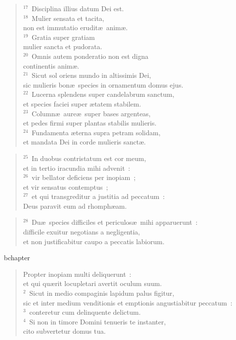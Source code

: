 \begin{verse}
${}^{17}$~Disciplina illius datum Dei est.\\
${}^{18}$~Mulier sensata et tacita,\\ non est immutatio erudit\ae\ anim\ae .\\
${}^{19}$~Gratia super gratiam\\ mulier sancta et pudorata.\\
${}^{20}$~Omnis autem ponderatio non est digna\\ continentis anim\ae .\\
${}^{21}$~Sicut sol oriens mundo in altissimis Dei,\\ sic mulieris bon\ae\ species in ornamentum domus ejus.\\
${}^{22}$~Lucerna splendens super candelabrum sanctum,\\ et species faciei super \ae tatem stabilem.\\
${}^{23}$~Column\ae\ aure\ae\ super bases argenteas,\\ et pedes firmi super plantas stabilis mulieris.\\
${}^{24}$~Fundamenta \ae terna supra petram solidam,\\ et mandata Dei in corde mulieris sanct\ae .\end{verse}


\begin{verse}${}^{25}$~In duobus contristatum est cor meum,\\ et in tertio iracundia mihi advenit~:\\
${}^{26}$~vir bellator deficiens per inopiam~;\\ et vir sensatus contemptus~;\\
${}^{27}$~et qui transgreditur a justitia ad peccatum~:\\ Deus paravit eum ad rhomph\ae am.\end{verse}


\begin{verse}${}^{28}$~Du\ae\ species difficiles et periculos\ae\ mihi apparuerunt~:\\ difficile exuitur negotians a negligentia,\\ et non justificabitur caupo a peccatis labiorum.\end{verse}


bchapter\begin{verse}\vspace{-19pt}Propter inopiam multi deliquerunt~:\\ et qui qu\ae rit locupletari avertit oculum suum.\\
${}^{2}$~Sicut in medio compaginis lapidum palus figitur,\\ sic et inter medium venditionis et emptionis angustiabitur peccatum~:\\
${}^{3}$~conteretur cum delinquente delictum.\\
${}^{4}$~Si non in timore Domini tenueris te instanter,\\ cito subvertetur domus tua.\end{verse}


